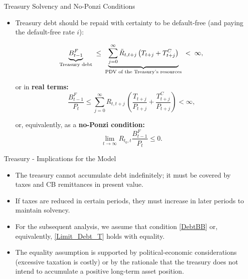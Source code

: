 \documentclass[11pt,aspectratio=169]{beamer}
\begin{document}
\begin{frame}{Treasury Solvency and No-Ponzi Conditions} 

\begin{itemize}
\item Treasury debt should be repaid with certainty to be default-free (and paying the default-free rate $i$):

\begin{equation*}
\underbrace{B_{t-1}^{F}}_{\text{\scriptsize Treasury debt}}
\;\le\;
\underbrace{\sum_{j=0}^{\infty} 
\tilde{R}_{t,t+j}\,\big(T_{t+j}+T_{t+j}^{C}\big)}_{\text{\scriptsize PDV of the Treasury's resources}}
\;<\;\infty,
\end{equation*}

\noindent or in \textbf{real terms:} 
\begin{equation} \frac{B_{t-1}^{F}}{P_t} \le \sum_{j=0}^{\infty} R_{t,t+j}\,\left(\frac{T_{t+j}}{P_{t+j}} + \frac{T_{t+j}^C}{P_{t+j}}\right) < \infty, \label{DebtBB} \end{equation} 

\noindent or, equivalently, as a \textbf{no-Ponzi condition:} 
\begin{equation} \lim_{t\to\infty} R_{t_0,t} \frac{B_{t-1}^F}{P_t} \le 0. \label{Limit_Debt_T} \end{equation}
\end{itemize}

\end{frame}


\begin{frame}{Treasury - Implications for the Model}

\begin{itemize}
    \item The treasury cannot accumulate debt indefinitely; it must be covered by taxes and CB remittances in present value.
    \item If taxes are reduced in certain periods, they must increase in later periods to maintain solvency.
    \item For the subsequent analysis, we assume that condition \eqref{DebtBB} or, equivalently, \eqref{Limit_Debt_T} holds with equality.
    \item The equality assumption is supported by political-economic considerations (excessive taxation is costly) or by the rationale that the treasury does not intend to accumulate a positive long-term asset position.

\end{itemize}

\end{frame}
\end{document}
